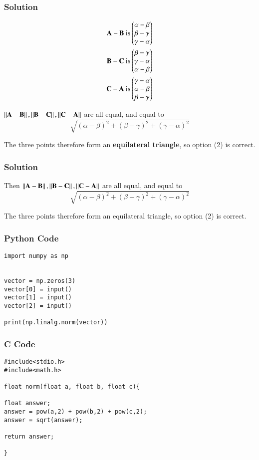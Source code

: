 \documentclass{beamer}
\begin{document}
\begin{frame}[fragile]
    \frametitle{Solution}
\begin{align}
\mathbf{A-B} \text{ is} \begin{pmatrix}\alpha - \beta \\ \beta - \gamma \\ \gamma - \alpha\end{pmatrix} \\
\mathbf{B-C} \text{ is} \begin{pmatrix}\beta - \gamma \\ \gamma - \alpha \\ \alpha - \beta\end{pmatrix} \\
\mathbf{C-A} \text{ is} \begin{pmatrix}\gamma - \alpha \\ \alpha - \beta \\ \beta - \gamma\end{pmatrix}
\end{align}


$\left\lVert\mathbf{A}-\mathbf{B}\right\rVert, \left\lVert\mathbf{B}-\mathbf{C}\right\rVert, \left\lVert\mathbf{C}-\mathbf{A}\right\rVert$ are all equal, and equal to
$$\sqrt{(\alpha - \beta)^2  + (\beta - \gamma)^2 + (\gamma - \alpha)^2}$$

The three points therefore form an \textbf{equilateral triangle}, so option (2) is correct.

\end{frame}


\begin{frame}[fragile]
    \frametitle{Solution}

Then $\left\lVert\mathbf{A-B}\right\rVert, \left\lVert\mathbf{B-C}\right\rVert, \left\lVert\mathbf{C-A}\right\rVert$ are all equal, and equal to
$$\sqrt{(\alpha - \beta)^2  + (\beta - \gamma)^2 + (\gamma - \alpha)^2}$$


The three points therefore form an equilateral triangle, so option (2) is correct.

\end{frame}


\begin{frame}[fragile]
    \frametitle{Python Code}
    \begin{lstlisting}
import numpy as np


vector = np.zeros(3)
vector[0] = input()
vector[1] = input()
vector[2] = input()

print(np.linalg.norm(vector))

\end{lstlisting}

\end{frame}


\begin{frame}[fragile]
\frametitle{C Code}
\begin{lstlisting}
#include<stdio.h>
#include<math.h>

float norm(float a, float b, float c){

float answer;
answer = pow(a,2) + pow(b,2) + pow(c,2);
answer = sqrt(answer);

return answer;

}
\end{lstlisting}

\end{frame}
\end{document}
